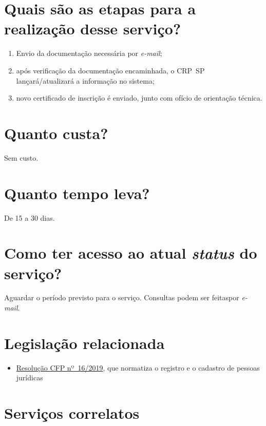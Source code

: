 \section{Quais são as etapas para a realização desse serviço?}

\begin{enumerate}
  \item  Envio da documentação necessária por \emph{e-mail};
  \item  após verificação da documentação encaminhada, o CRP~SP  lançará/atualizará a informação no sistema;
  \item  novo certificado de inscrição é enviado, junto com ofício de  orientação técnica.
\end{enumerate}

\section{Quanto custa?}

Sem custo.

\section{Quanto tempo leva?}

De 15 a 30 dias.

\section{Como ter acesso ao atual \emph{status} do serviço?}

Aguardar o período previsto para o serviço. Consultas podem ser feitaspor \emph{e-mail}.

\section{Legislação relacionada}

\begin{itemize}
  \item  \href{https://atosoficiais.com.br/cfp/resolucao-administrativa-financeira-n-16-2019-altera-o-manual-de-procedimentos-administrativo-e-financeiro-do-sistema-conselhos-de-psicologia-anexo-da-resolucao-cfp-n-202018-a-resolucao-cfp-n-03-2007-a-resolucao-cfp-n-16-2019-e-da-outras-providencias}{Resolução  CFP nº~16/2019}, que normatiza o registro e o cadastro de pessoas  jurídicas
\end{itemize}

\section{Serviços correlatos}

